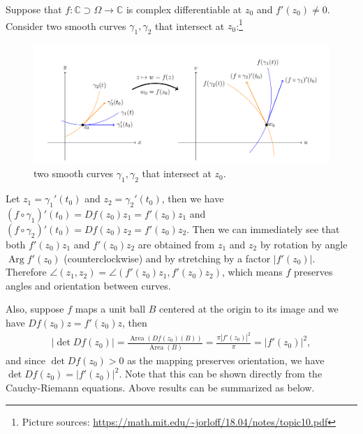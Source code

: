 \documentclass[11pt]{book}
\theoremstyle{definition}
\numberwithin{equation}{chapter}
\begin{document}
Suppose that $f: \mathbb{C} \supset \Omega \to \mathbb{C}$ is complex differentiable at $z_0$ and $f'(z_0) \neq 0$. Consider two smooth curves $\gamma_1, \gamma_2$ that intersect at $z_0$:\footnote{Picture sources: \url{https://math.mit.edu/~jorloff/18.04/notes/topic10.pdf}}
\begin{figure}[H]
    \centering
    \includegraphics[width=1\textwidth]{conformal_map.png}
    \caption{two smooth curves $\gamma_1, \gamma_2$ that intersect at $z_0$.}
    \label{fig:two_curve}
\end{figure}
Let $z_1 = \gamma_1'(t_0)$ and $z_2 = \gamma_2'(t_0)$, then we have $(f \circ \gamma_1)'(t_0) = Df(z_0) z_1 = f'(z_0) z_1$ and $(f \circ \gamma_2)'(t_0) = Df(z_0) z_2 = f'(z_0) z_2$. Then we can immediately see that both $f'(z_0) z_1$ and $f'(z_0) z_2$ are obtained from $z_1$ and $z_2$ by rotation by angle $\operatorname{Arg} f'(z_0)$ (counterclockwise) and by stretching by a factor $\left|f'(z_0)\right|$. Therefore $\angle (z_1, z_2) = \angle (f'(z_0) z_1, f'(z_0) z_2)$, which means $f$ preserves angles and orientation between curves.

Also, suppose $f$ maps a unit ball $B$ centered at the origin to its image and we have $Df(z_0) z = f'(z_0) z$, then 
\begin{align}\label{sec_76_equ1}
    \left|\det Df(z_0) \right| = \frac{\operatorname{Area} (Df(z_0)(B))}{\operatorname{Area}(B)} = \frac{\pi \left|f'(z_0)\right|^2}{\pi} = \left|f'(z_0)\right|^2,
\end{align}
and since $\det Df(z_0) > 0$ as the mapping preserves orientation, we have $\det Df(z_0) = \left|f'(z_0)\right|^2$. Note that this can be shown directly from the Cauchy-Riemann equations. Above results can be summarized as below.

\medskip
\end{document}
